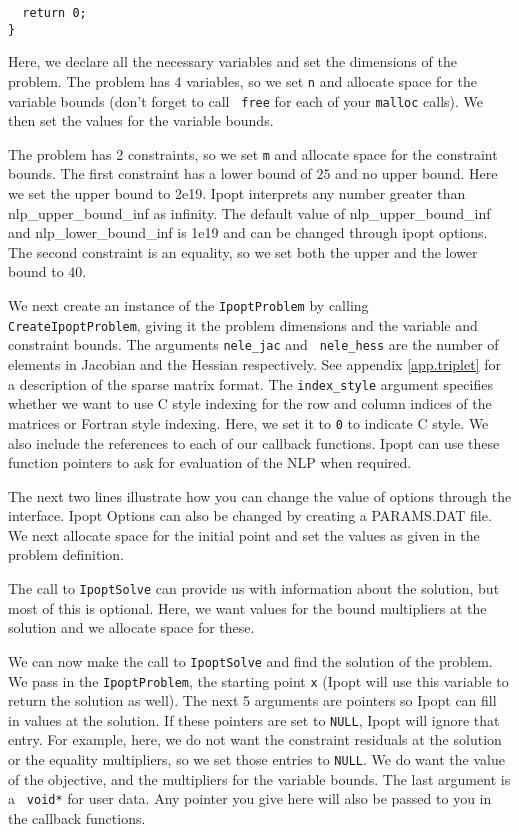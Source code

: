 \documentclass[letter,10pt]{article}
\begin{document}
{\begin{verbatim}
  return 0;
}
\end{verbatim}
Here, we declare all the necessary variables and set the dimensions of
the problem.  The problem has 4 variables, so we set {\tt n} and
allocate space for the variable bounds (don't forget to call {\tt
free} for each of your {\tt malloc} calls). We then set the values for
the variable bounds.  

The problem has 2 constraints, so we set {\tt m}
and allocate space for the constraint bounds. The first constraint has
a lower bound of $25$ and no upper bound.  Here we set the upper bound
to 2e19. Ipopt interprets any number greater than nlp_upper_bound_inf
as infinity. The default value of nlp_upper_bound_inf and
nlp_lower_bound_inf is 1e19 and can be changed through ipopt options.
The second constraint is an equality, so we set both the upper and the 
lower bound to $40$.

We next create an instance of the {\tt IpoptProblem} by calling {\tt
CreateIpoptProblem}, giving it the problem dimensions and the variable
and constraint bounds. The arguments {\tt nele\_jac} and {\tt
nele\_hess} are the number of elements in Jacobian and the Hessian
respectively. See appendix \ref{app.triplet} for a description of the
sparse matrix format. The {\tt index_style} argument specifies whether
we want to use C style indexing for the row and column indices of the
matrices or Fortran style indexing. Here, we set it to {\tt 0} to
indicate C style.  We also include the references to each of our
callback functions. Ipopt can use these function pointers to ask for
evaluation of the NLP when required.

The next two lines illustrate how you can change the value of options
through the interface.  Ipopt Options can also be changed by creating
a PARAMS.DAT file. We next allocate space for the initial point and
set the values as given in the problem definition.

The call to {\tt IpoptSolve} can provide us with information about the solution,
but most of this is optional. Here, we want values for the bound multipliers at
the solution and we allocate space for these.

We can now make the call to {\tt IpoptSolve} and find the solution of
the problem. We pass in the {\tt IpoptProblem}, the starting point
{\tt x} (Ipopt will use this variable to return the solution as
well). The next 5 arguments are pointers so Ipopt can fill in values
at the solution.  If these pointers are set to {\tt NULL}, Ipopt will
ignore that entry.  For example, here, we do not want the constraint
residuals at the solution or the equality multipliers, so we set those
entries to {\tt NULL}. We do want the value of the objective, and the
multipliers for the variable bounds. The last argument is a {\tt
void*} for user data. Any pointer you give here will also be passed to
you in the callback functions.

}
\end{document}
